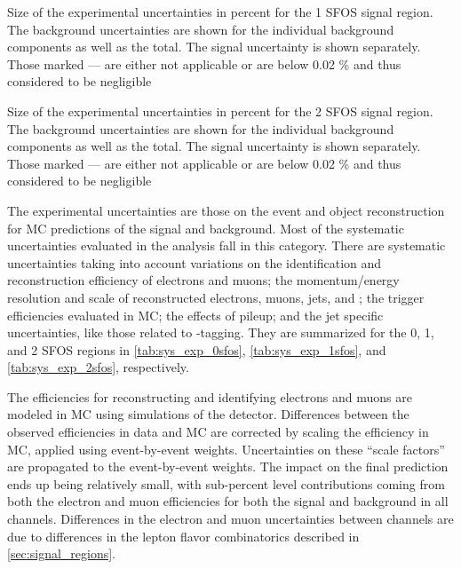 \begin{table}[ht!]
\centering

\caption{Size of the experimental uncertainties in percent for the 1 SFOS signal region. The background uncertainties are shown for the individual background components as well as the total. The signal uncertainty is shown separately. Those marked --- are either not applicable or are below 0.02 \% and thus considered to be negligible}
\label{tab:sys_exp_1sfos}
\end{table}

\begin{table}[ht!]
\centering

\caption{Size of the experimental uncertainties in percent for the 2 SFOS signal region. The background uncertainties are shown for the individual background components as well as the total. The signal uncertainty is shown separately. Those marked --- are either not applicable or are below 0.02 \% and thus considered to be negligible}
\label{tab:sys_exp_2sfos}
\end{table}
The experimental uncertainties are those on the event and object
reconstruction for MC predictions of  the signal
and background.
Most of the systematic uncertainties evaluated in the analysis
fall in this category.
There are systematic uncertainties taking into account variations
on the identification and reconstruction
efficiency of electrons and muons; 
the momentum/energy resolution and scale of reconstructed electrons, muons,
jets, and \MET; the trigger
efficiencies evaluated in MC; the effects of pileup; and the jet 
specific uncertainties, like those related to \bee-tagging.
They are summarized for the 0, 1, and 2 SFOS regions
in \tab\ref{tab:sys_exp_0sfos}, 
\tab\ref{tab:sys_exp_1sfos}, and
\tab\ref{tab:sys_exp_2sfos}, respectively.

The efficiencies for reconstructing and identifying electrons and muons
are modeled in MC using simulations of the detector. Differences
between the observed efficiencies in data and MC are corrected by scaling
the efficiency in MC, applied using event-by-event weights. 
Uncertainties on these ``scale factors'' are propagated to the event-by-event
weights.  The impact on the final prediction ends up being relatively
small, with sub-percent level contributions coming from both the electron
and muon efficiencies for both the signal and background in all channels.
Differences in the electron and muon uncertainties between channels
are due to differences in the lepton flavor combinatorics described in
\sec\ref{sec:signal_regions}.

